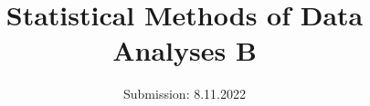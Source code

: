 

\subject{Sheet 2}
\title{Statistical Methods of Data Analyses B}
\date{
  Submission: 8.11.2022
}


\maketitle


\newpage




